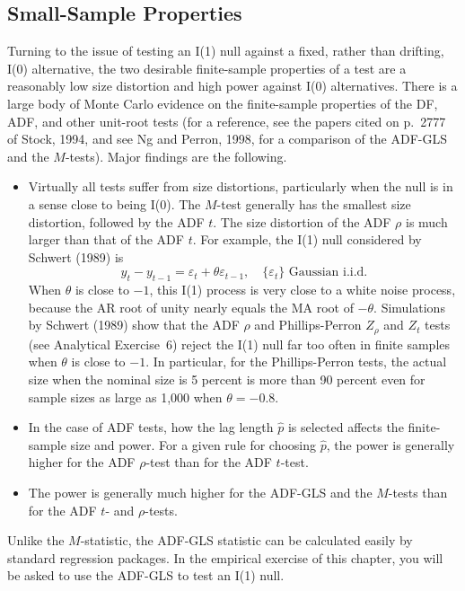 \subsection*{Small-Sample Properties}

Turning to the issue of testing an I(1) null against a fixed, rather than drifting, I(0)
alternative, the two desirable finite-sample properties of a test are a reasonably low
size distortion and high power against I(0) alternatives. There is a large body of
Monte Carlo evidence on the finite-sample properties of the DF, ADF, and other
unit-root tests (for a reference, see the papers cited on p.~2777 of Stock, 1994, and
see Ng and Perron, 1998, for a comparison of the ADF-GLS and the $M$-tests).
Major findings are the following.

\begin{itemize}
\item Virtually all tests suffer from size distortions, particularly when the null is in a
sense close to being I(0). The $M$-test generally has the smallest size distortion,
followed by the ADF $t$. The size distortion of the ADF $\rho$ is much larger than
that of the ADF $t$. For example, the I(1) null considered by Schwert (1989) is
\begin{equation}
\label{eq:9.5.2}
y_t - y_{t-1} = \varepsilon_t + \theta \varepsilon_{t-1}, \quad
\{\varepsilon_t\} \text{ Gaussian i.i.d.}
\end{equation}
When $\theta$ is close to $-1$, this I(1) process is very close to a white noise process,
because the AR root of unity nearly equals the MA root of $-\theta$. Simulations by
Schwert (1989) show that the ADF $\rho$ and Phillips-Perron $Z_\rho$ and $Z_t$ tests (see
Analytical Exercise~6) reject the I(1) null far too often in finite samples when $\theta$
is close to $-1$. In particular, for the Phillips-Perron tests, the actual size when
the nominal size is 5 percent is more than 90 percent even for sample sizes as
large as 1,000 when $\theta = -0.8$.

\item In the case of ADF tests, how the lag length $\hat{p}$ is selected affects the finite-sample size and power. For a given rule for choosing $\hat{p}$, the power is generally
higher for the ADF $\rho$-test than for the ADF $t$-test.

\item The power is generally much higher for the ADF-GLS and the $M$-tests than for
the ADF $t$- and $\rho$-tests.
\end{itemize}

Unlike the $M$-statistic, the ADF-GLS statistic can be calculated easily by standard
regression packages. In the empirical exercise of this chapter, you will be asked to
use the ADF-GLS to test an I(1) null.
